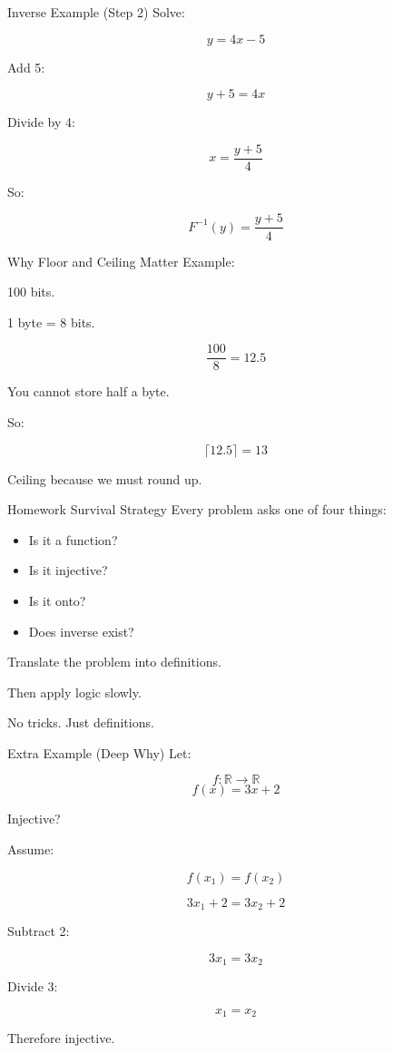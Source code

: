 \documentclass[aspectratio=169]{beamer}
\begin{document}
\begin{frame}{Inverse Example (Step 2)}
Solve:

\[
y=4x-5
\]

Add 5:

\[
y+5=4x
\]

Divide by 4:

\[
x=\frac{y+5}{4}
\]

So:

\[
F^{-1}(y)=\frac{y+5}{4}
\]
\end{frame}

\begin{frame}{Why Floor and Ceiling Matter}
Example:

100 bits.

1 byte = 8 bits.

\[
\frac{100}{8}=12.5
\]

You cannot store half a byte.

So:

\[
\lceil 12.5 \rceil = 13
\]

Ceiling because we must round up.
\end{frame}

\begin{frame}{Homework Survival Strategy}
Every problem asks one of four things:

\begin{itemize}
\item Is it a function?
\item Is it injective?
\item Is it onto?
\item Does inverse exist?
\end{itemize}

Translate the problem into definitions.

Then apply logic slowly.

No tricks. Just definitions.
\end{frame}

\begin{frame}{Extra Example (Deep Why)}
Let:

\[
f: \mathbb{R} \to \mathbb{R}
\]
\[
f(x)=3x+2
\]

Injective?

Assume:

\[
f(x_1)=f(x_2)
\]

\[
3x_1+2=3x_2+2
\]

Subtract 2:

\[
3x_1=3x_2
\]

Divide 3:

\[
x_1=x_2
\]

Therefore injective.
\end{frame}
\end{document}
